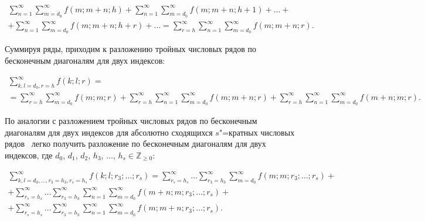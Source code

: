 \begin{multline*}

\sum_{n=1}^\infty\sum_{m=d_0}^\infty f(m;m+n;h)+

\sum_{n=1}^\infty\sum_{m=d_0}^\infty f(m;m+n;h+1)+\ldots +\\

+\sum_{n=1}^\infty\sum_{m=d_0}^\infty f(m;m+n;h+r)+\ldots =

\sum_{r=h}^\infty\sum_{n=1}^\infty\sum_{m=d_0}^\infty f(m;m+n;r).%

\end{multline*}



Суммируя ряды, приходим к разложению тройных числовых рядов по бесконечным диагоналям для двух индексов:

\begin{multline*}

\sum_{k,l=d_0,r=h}^\infty f(k;l;r)=

\\

=\sum_{r=h}^\infty\sum_{m=d_0}^\infty f(m;m;r)+

\sum_{r=h}^\infty\sum_{n=1}^\infty\sum_{m=d_0}^\infty f(m;m+n;r)+

\sum_{r=h}^\infty\sum_{n=1}^\infty\sum_{m=d_0}^\infty f(m+n;m;r).

\end{multline*}







По аналогии с разложением тройных числовых рядов по бесконечным диагоналям для двух индексов для абсолютно сходящихся $s$"=кратных числовых рядов~\cite{korneev:1} легко получить разложение по бесконечным диагоналям для двух индексов, где $d_0$, $d_1$, $d_2$, $h_3$, $\ldots$, $h_s\in\mathbb{Z}_{\ge 0}$:

\begin{multline*}

\sum_{k,l=d_0,\ldots,r_3=h_3,r_s=h_s}^\infty f(k;l;r_3;\ldots;r_s)=

\sum_{r_s=h_s}^\infty\ldots\sum_{r_3=h_3}^\infty\sum_{m=d_0}^\infty f(m;m;r_3;\ldots ;r_s)+




\\

+\sum_{r_s=h_s}^\infty\ldots\sum_{r_3=h_3}^\infty\sum_{n=1}^\infty\sum_{m=d_0}^\infty f(m+n;m;r_3;\ldots;r_s)+

\\

+\sum_{r_s=h_s}^\infty\ldots\sum_{r_3=h_3}^\infty\sum_{n=1}^\infty\sum_{m=d_0}^\infty f(m;m+n;r_3;\ldots;r_s).

\end{multline*}

